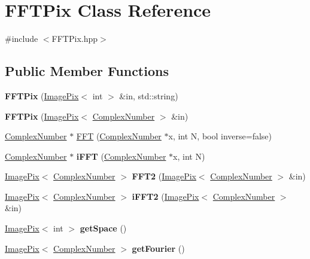 \hypertarget{class_f_f_t_pix}{}\section{F\+F\+T\+Pix Class Reference}
\label{class_f_f_t_pix}


{\ttfamily \#include $<$F\+F\+T\+Pix.\+hpp$>$}

\subsection*{Public Member Functions}
\begin{DoxyCompactItemize}
\item 
\mbox{\label{class_f_f_t_pix_a3a2315d33b0012b47af83f1f61da1f2a}} 
{\bfseries F\+F\+T\+Pix} (\hyperlink{class_image_pix}{Image\+Pix}$<$ int $>$ \&in, std\+::string)
\item 
\mbox{\label{class_f_f_t_pix_a978e768e54677662ec082870e1ce7fa2}} 
{\bfseries F\+F\+T\+Pix} (\hyperlink{class_image_pix}{Image\+Pix}$<$ \hyperlink{class_complex_number}{Complex\+Number} $>$ \&in)
\item 
\hyperlink{class_complex_number}{Complex\+Number} $\ast$ \hyperlink{class_f_f_t_pix_aa0b0b6a2bff47b800d3e61770a187ba6}{F\+FT} (\hyperlink{class_complex_number}{Complex\+Number} $\ast$x, int N, bool inverse=false)
\item 
\mbox{\label{class_f_f_t_pix_ab28ee558de51f9951106710bf48a9e2f}} 
\hyperlink{class_complex_number}{Complex\+Number} $\ast$ {\bfseries i\+F\+FT} (\hyperlink{class_complex_number}{Complex\+Number} $\ast$x, int N)
\item 
\mbox{\label{class_f_f_t_pix_a12fc448d7b8f8dc731621a457da0241a}} 
\hyperlink{class_image_pix}{Image\+Pix}$<$ \hyperlink{class_complex_number}{Complex\+Number} $>$ {\bfseries F\+F\+T2} (\hyperlink{class_image_pix}{Image\+Pix}$<$ \hyperlink{class_complex_number}{Complex\+Number} $>$ \&in)
\item 
\mbox{\label{class_f_f_t_pix_acc27a8bd3ee42fba90e30765287822e9}} 
\hyperlink{class_image_pix}{Image\+Pix}$<$ \hyperlink{class_complex_number}{Complex\+Number} $>$ {\bfseries i\+F\+F\+T2} (\hyperlink{class_image_pix}{Image\+Pix}$<$ \hyperlink{class_complex_number}{Complex\+Number} $>$ \&in)
\item 
\mbox{\label{class_f_f_t_pix_a15fa556b7d65a6c8e21e451d2184fcd0}} 
\hyperlink{class_image_pix}{Image\+Pix}$<$ int $>$ {\bfseries get\+Space} ()
\item 
\mbox{\label{class_f_f_t_pix_ae88f60d77bb4f21eb9a9d7cb68b518a8}} 
\hyperlink{class_image_pix}{Image\+Pix}$<$ \hyperlink{class_complex_number}{Complex\+Number} $>$ {\bfseries get\+Fourier} ()
\end{DoxyCompactItemize}


